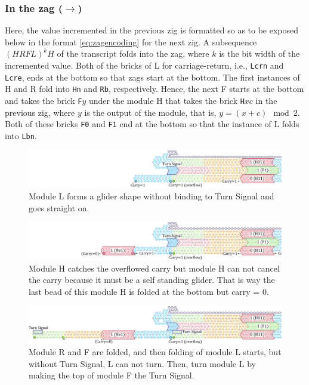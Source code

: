 \documentclass[runningheads]{llncs}
\begin{document}
\subsubsection{In the zag ($\rightarrow$)}
Here, the value incremented in the previous zig is formatted so as to be exposed below in the format \eqref{eq:zagencoding} for the next zig.
A subsequence $(HRFL)^kH$ of the transcript folds into the zag, where $k$ is the bit width of the incremented value.
Both of the bricks of L for carriage-return, i.e., \texttt{Lcrn} and \texttt{Lcre}, ends at the bottom so that zags start at the bottom.
The first instances of H and R fold into \texttt{Hn} and \texttt{Rb}, respectively.
Hence, the next F starts at the bottom and takes the brick \texttt{F}$y$ under the module H  that takes the brick \texttt{H}$xc$ in the previous zig, where $y$ is the output of the module, that is, $y = (x+c) \mod 2$.
Both of these bricks \texttt{F0} and \texttt{F1} end at the bottom so that the instance of L folds into \texttt{Lbn}.


\begin{figure}[tb]
\centering
\includegraphics[width=\linewidth]{fig/svg/CounterEx14_1.pdf}
\caption{
Module L forms a glider shape without binding to Turn Signal and goes straight on. 
}
\label{fig:overflowex2}
\end{figure}

\begin{figure}[tb]
\centering
\includegraphics[width=\linewidth]{fig/svg/CounterEx15_1.pdf}
\caption{
Module H catches the overflowed carry but module H can not cancel the carry because it must be a self standing glider.
That is way the last bead of this module H is folded at the bottom but carry = 0. 
}
\label{fig:overflowex3}
\end{figure}


\begin{figure}[tb]
\centering
\includegraphics[width=\linewidth]{fig/svg/CounterEx17_1.pdf}
\caption{
Module R and F are folded, and then folding of module L starts, but without Turn Signal, L can not turn.
Then, turn module L by making the top of module F the Turn Signal.
}
\label{fig:overflowex4}
\end{figure}
\end{document}
